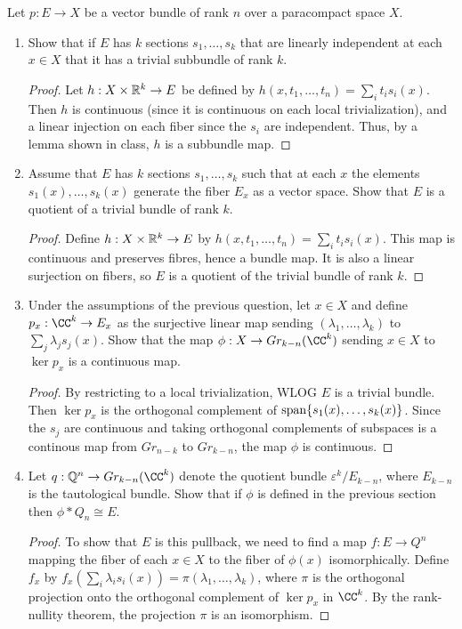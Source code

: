 \documentclass{article}
\begin{document}
 Let $p:E \to X$ be a vector bundle of rank $n$ over a paracompact space $X$.
\begin{enumerate}[(1)]
\item Show that if $E$ has $k$ sections $s_1, \ldots, s_k$ that are linearly independent at each $x \in X$ that
it has a trivial subbundle of rank $k$.
\begin{proof}
Let $h: X \times \mathbb{R}^k \to E$ be defined by $h(x,t_1, \ldots, t_n) = \sum_i t_i s_i(x)$. 
Then $h$ is continuous (since it is continuous on each local trivialization), and a linear injection on each fiber since the $s_i$ are independent.  Thus, by a lemma shown in class, $h$ is a subbundle map.
\end{proof}
\item Assume that $E$ has $k$ sections $s_1, \ldots, s_k$ such that at each $x$ the elements $s_1(x), \ldots, s_k(x)$
generate the fiber $E_x$ as a vector space. Show that $E$ is a quotient of a trivial bundle of rank $k$.
\begin{proof}
Define $h:X \times \mathbb{R}^k \to E$ by $h(x, t_1, \ldots, t_n) = \sum_i t_i s_i(x)$.  This map is continuous and preserves fibres, hence a bundle map. It is also a linear surjection on fibers, so $E$ is a quotient of the trivial bundle of rank $k$.
\end{proof}
\item Under the assumptions of the previous question, let $x \in X$ and define $p_x: \CC^k \to E_x$ as the surjective linear map sending
$(\lambda_1, \ldots, \lambda_k)$ to $\sum_j \lambda_j s_j(x)$.  Show that the map $\phi : X \to Gr_{k-n}(\CC^k)$ sending $x \in X$ to $\ker p_x$ is a continuous map.
\begin{proof}
By restricting to a local trivialization, WLOG $E$ is a trivial bundle.  Then $\ker p_x$ is the orthogonal complement of $\operatorname{span}\{s_1(x), \ldots, s_k(x)\}$. 
Since the $s_j$ are continuous and taking orthogonal complements of subspaces is a continous map from $Gr_{n-k}$ to $Gr_{k-n}$, the map $\phi$ is continuous.
\end{proof}
\item Let $q: \Q^n \to Gr_{k-n}(\CC^k)$ denote the quotient bundle $\varepsilon^k/E_{k-n}$, where $E_{k-n}$ is the tautological bundle. Show that if $\phi$ is defined in the previous section then $\phi* Q_n \cong E$.
\begin{proof}
To show that $E$ is this pullback, we need to find a map $f:  E \to Q^n$ mapping the fiber of each $x \in X$ to the fiber of $\phi(x)$ isomorphically. Define $f_x$ by $f_x(\sum_i \lambda_i s_i(x)) = \pi(\lambda_1, \ldots, \lambda_k)$, where $\pi$ is the orthogonal projection onto the orthogonal complement of $\ker p_x$ in $\CC^k$. By the rank-nullity theorem, the projection $\pi$ is an isomorphism.
\end{proof}

\end{enumerate}
\end{document}
